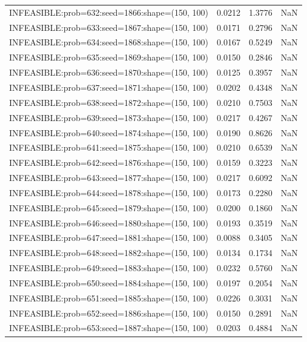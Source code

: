 \begin{longtable}{lccc}
INFEASIBLE:prob=632:seed=1866:shape=(150, 100) &   0.0212 &  1.3776 &    NaN \\
INFEASIBLE:prob=633:seed=1867:shape=(150, 100) &   0.0171 &  0.2796 &    NaN \\
INFEASIBLE:prob=634:seed=1868:shape=(150, 100) &   0.0167 &  0.5249 &    NaN \\
INFEASIBLE:prob=635:seed=1869:shape=(150, 100) &   0.0150 &  0.2846 &    NaN \\
INFEASIBLE:prob=636:seed=1870:shape=(150, 100) &   0.0125 &  0.3957 &    NaN \\
INFEASIBLE:prob=637:seed=1871:shape=(150, 100) &   0.0202 &  0.4348 &    NaN \\
INFEASIBLE:prob=638:seed=1872:shape=(150, 100) &   0.0210 &  0.7503 &    NaN \\
INFEASIBLE:prob=639:seed=1873:shape=(150, 100) &   0.0217 &  0.4267 &    NaN \\
INFEASIBLE:prob=640:seed=1874:shape=(150, 100) &   0.0190 &  0.8626 &    NaN \\
INFEASIBLE:prob=641:seed=1875:shape=(150, 100) &   0.0210 &  0.6539 &    NaN \\
INFEASIBLE:prob=642:seed=1876:shape=(150, 100) &   0.0159 &  0.3223 &    NaN \\
INFEASIBLE:prob=643:seed=1877:shape=(150, 100) &   0.0217 &  0.6092 &    NaN \\
INFEASIBLE:prob=644:seed=1878:shape=(150, 100) &   0.0173 &  0.2280 &    NaN \\
INFEASIBLE:prob=645:seed=1879:shape=(150, 100) &   0.0200 &  0.1860 &    NaN \\
INFEASIBLE:prob=646:seed=1880:shape=(150, 100) &   0.0193 &  0.3519 &    NaN \\
INFEASIBLE:prob=647:seed=1881:shape=(150, 100) &   0.0088 &  0.3405 &    NaN \\
INFEASIBLE:prob=648:seed=1882:shape=(150, 100) &   0.0134 &  0.1734 &    NaN \\
INFEASIBLE:prob=649:seed=1883:shape=(150, 100) &   0.0232 &  0.5760 &    NaN \\
INFEASIBLE:prob=650:seed=1884:shape=(150, 100) &   0.0197 &  0.2054 &    NaN \\
INFEASIBLE:prob=651:seed=1885:shape=(150, 100) &   0.0226 &  0.3031 &    NaN \\
INFEASIBLE:prob=652:seed=1886:shape=(150, 100) &   0.0150 &  0.2891 &    NaN \\
INFEASIBLE:prob=653:seed=1887:shape=(150, 100) &   0.0203 &  0.4884 &    NaN \\

\end{longtable}
